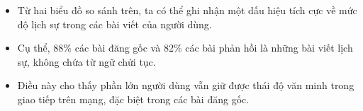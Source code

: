 \begin{itemize}
    \item Từ hai biểu đồ so sánh trên, ta có thể ghi nhận một dấu hiệu tích cực về mức độ lịch sự trong các bài viết của người dùng.
    \item Cụ thể, 88\% các bài đăng gốc và 82\% các bài phản hồi là những bài viết lịch sự, không chứa từ ngữ chửi tục.
    \item Điều này cho thấy phần lớn người dùng vẫn giữ được thái độ văn minh trong giao tiếp trên mạng, đặc biệt trong các bài đăng gốc.
\end{itemize}
